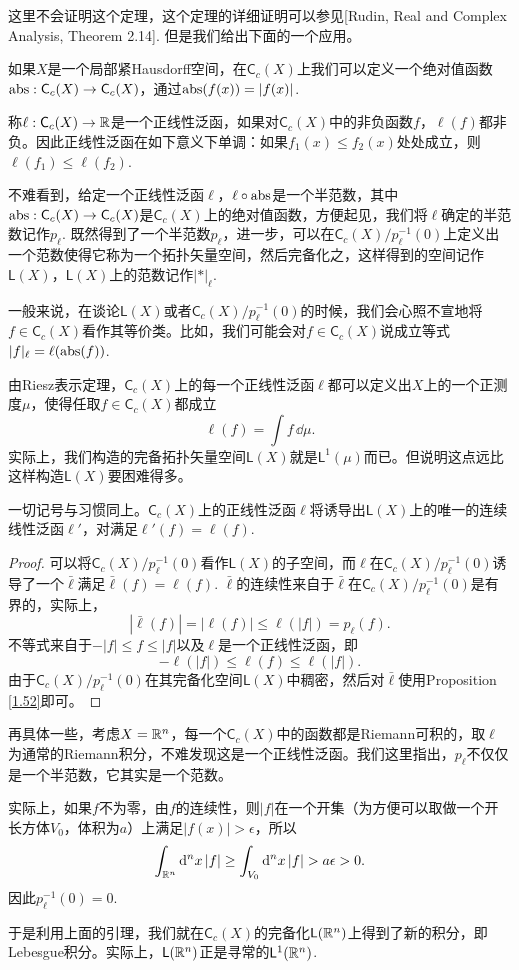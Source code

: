这里不会证明这个定理，这个定理的详细证明可以参见[Rudin, Real and Complex Analysis, Theorem 2.14]. 但是我们给出下面的一个应用。

\begin{para}
如果$X$是一个局部紧Hausdorff空间，在$\mathsf{C}_c(X)$上我们可以定义一个绝对值函数$\operatorname{abs}:\mathsf{C}_c(X)\to \mathsf{C}_c(X)$，通过$\operatorname{abs}(f(x))=|f(x)|$. 

称$\ell:\mathsf{C}_c(X)\to \mathbb{R}$是一个正线性泛函，如果对$\mathsf{C}_c(X)$中的非负函数$f$，$\ell(f)$都非负。因此正线性泛函在如下意义下单调：如果$f_1(x)\leq f_2(x)$处处成立，则$\ell(f_1)\leq \ell(f_2)$.

不难看到，给定一个正线性泛函$\ell$，$\ell\circ \operatorname{abs}$是一个半范数，其中$\operatorname{abs}:\mathsf{C}_c(X)\to \mathsf{C}_c(X)$是$\mathsf{C}_c(X)$上的绝对值函数，方便起见，我们将$\ell$确定的半范数记作$p_\ell$. 既然得到了一个半范数$p_\ell$，进一步，可以在$\mathsf{C}_c(X)/p_\ell^{-1}(0)$上定义出一个范数使得它称为一个拓扑矢量空间，然后完备化之，这样得到的空间记作$\mathsf{L}(X)$，$\mathsf{L}(X)$上的范数记作$|*|_\ell$. 

一般来说，在谈论$\mathsf{L}(X)$或者$\mathsf{C}_c(X)/p_\ell^{-1}(0)$的时候，我们会心照不宣地将$f\in \mathsf{C}_c(X)$看作其等价类。比如，我们可能会对$f\in \mathsf{C}_c(X)$说成立等式$|f|_\ell = \ell(\operatorname{abs}(f))$.

由Riesz表示定理，$\mathsf{C}_c(X)$上的每一个正线性泛函$\ell$都可以定义出$X$上的一个正测度$\mu$，使得任取$f\in \mathsf{C}_c(X)$都成立
\[
	\ell(f)=\int f\,\dd \mu.
\]
实际上，我们构造的完备拓扑矢量空间$\mathsf{L}(X)$就是$\mathsf{L}^1(\mu)$而已。但说明这点远比这样构造$\mathsf{L}(X)$要困难得多。

\begin{lem}
	一切记号与习惯同上。$\mathsf{C}_c(X)$上的正线性泛函$\ell$将诱导出$\mathsf{L}(X)$上的唯一的连续线性泛函$\ell'$，对满足$\ell'(f)=\ell(f)$.
\end{lem}

\begin{proof}
	可以将$\mathsf{C}_c(X)/p_\ell^{-1}(0)$看作$\mathsf{L}(X)$的子空间，而$\ell$在$\mathsf{C}_c(X)/p_\ell^{-1}(0)$诱导了一个$\bar{\ell}$满足$\bar{\ell}(f)=\ell(f)$. $\bar{\ell}$的连续性来自于$\bar{\ell}$在$\mathsf{C}_c(X)/p_\ell^{-1}(0)$是有界的，实际上，
	\[
	|\bar{\ell}(f)|=|\ell(f)|\leq \ell(|f|)=p_\ell(f).
	\]
	不等式来自于$-|f|\leq f\leq |f|$以及$\ell$是一个正线性泛函，即
	\[
	-\ell(|f|)\leq \ell(f)\leq \ell(|f|).
	\]
	由于$\mathsf{C}_c(X)/p_\ell^{-1}(0)$在其完备化空间$\mathsf{L}(X)$中稠密，然后对$\bar{\ell}$使用Proposition \ref{1.52}即可。
\end{proof}

再具体一些，考虑$X=\mathbb{R}^n$，每一个$\mathsf{C}_c(X)$中的函数都是Riemann可积的，取$\ell$为通常的Riemann积分，不难发现这是一个正线性泛函。我们这里指出，$p_\ell$不仅仅是一个半范数，它其实是一个范数。

实际上，如果$f$不为零，由$f$的连续性，则$|f|$在一个开集（为方便可以取做一个开长方体$V_0$，体积为$a$）上满足$|f(x)|>\epsilon$，所以
\[
	\int_{\rr^n}\dd^n x\, |f|\geq \int_{V_0}\dd^n x\, |f|>a\epsilon>0.
\]
因此$p_\ell^{-1}(0)=0$.

于是利用上面的引理，我们就在$\mathsf{C}_c(X)$的完备化$\mathsf{L}(\mathbb{R}^n)$上得到了新的积分，即Lebesgue积分。实际上，$\mathsf{L}(\mathbb{R}^n)$正是寻常的$\mathsf{L}^1(\mathbb{R}^n)$.
\end{para}